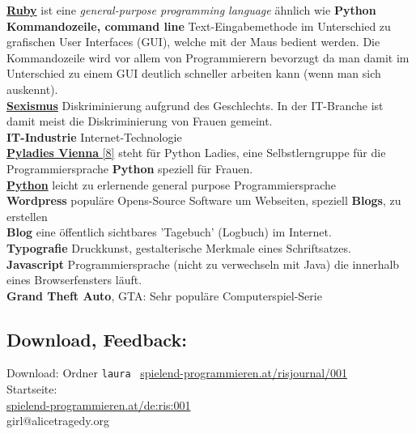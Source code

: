 \documentclass[10pt,a4paper,ngerman,twoside]{article} %
\begin{document}
\begin{multicols}{3}
\href{https://en.wikipedia.org/wiki/Ruby_(programming_language)}{\textbf{Ruby}} ist eine \textit{general-purpose programming language} ähnlich wie \textbf{Python} \\

\textbf{Kommandozeile, command line} Text-Eingabemethode im Unterschied zu grafischen User Interfaces (GUI), welche mit der Maus bedient werden. Die Kommandozeile wird vor allem von Programmierern bevorzugt da man damit im Unterschied zu einem GUI deutlich schneller arbeiten kann (wenn man sich auskennt). \\

\href{https://de.wikipedia.org/wiki/Sexismus}{\textbf{Sexismus}} Diskriminierung aufgrund des Geschlechts. In der IT-Branche ist damit meist die Diskriminierung von Frauen gemeint. \\

\textbf{IT-Industrie} Internet-Technologie \\

\href{https://twitter.com/pyladies_vie}{\textbf{Pyladies Vienna} [8]} steht für Python Ladies, eine Selbstlerngruppe für die Programmiersprache  \textbf{Python} speziell für Frauen. \\

\href{http://python.org}{\textbf{Python}} leicht zu erlernende general purpose Programmiersprache \\

\textbf{Wordpress} populäre Opens-Source Software um Webseiten, speziell \textbf{Blogs}, zu erstellen \\

\textbf{Blog} eine öffentlich sichtbares 'Tagebuch' (Logbuch) im Internet. \\

\textbf{Typografie} Druckkunst, gestalterische Merkmale eines Schriftsatzes. \\

\textbf{Javascript} Programmiersprache (nicht zu verwechseln mit Java) die innerhalb eines Browserfensters läuft. \\

\textbf{Grand Theft Auto}, GTA: Sehr populäre Computerspiel-Serie 

\subsection*{Download, Feedback:}
\footnotesize{
Download: Ordner \texttt{laura} \Mundus\ \href{http://spielend-programmieren.at/risjournal/001}{spielend-programmieren.at/risjournal/001}\\
Startseite:\\
\href{http://spielend-programmieren.at/de:ris:001}{spielend-programmieren.at/de:ris:001}\\ 
\Letter\:  girl@alicetragedy.org \\}
\normalsize
 


\end{multicols}
\end{document}
